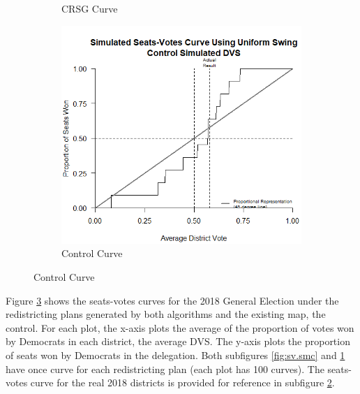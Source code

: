 \begin{figure}[h]
\begin{subfigure}[b]{0.3\textwidth}
        \caption{CRSG Curve}
        \label{fig:sv.crsg}
    \end{subfigure}
    \hfill
    \begin{subfigure}[b]{0.3\textwidth}
        \includegraphics[width=\textwidth]{img/sv.control.png}
        \caption{Control Curve}
        \label{fig:sv.control}
    \end{subfigure}
    \label{fig:sv}
    \raggedright
\end{figure}

Figure \ref{fig:sv} shows the seats-votes curves \parencite{katz2020} for the 2018 General Election under the redistricting plans generated by both algorithms and the existing map, the control. For each plot, the x-axis plots the average of the proportion of votes won by Democrats in each district, the average DVS. The y-axis plots the proportion of seats won by Democrats in the delegation. Both subfigures \ref{fig:sv.smc} and \ref{fig:sv.crsg} have once curve for each redistricting plan (each plot has 100 curves). The seats-votes curve for the real 2018 districts is provided for reference in subfigure \ref{fig:sv.control}.

